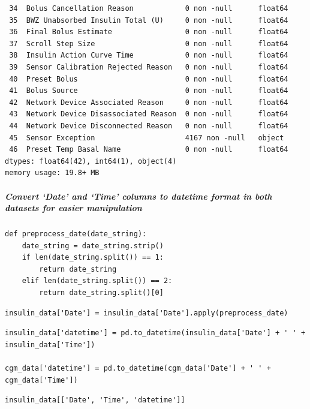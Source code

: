 \begin{verbatim}
 34  Bolus Cancellation Reason            0 non -null      float64
 35  BWZ Unabsorbed Insulin Total (U)     0 non -null      float64
 36  Final Bolus Estimate                 0 non -null      float64
 37  Scroll Step Size                     0 non -null      float64
 38  Insulin Action Curve Time            0 non -null      float64
 39  Sensor Calibration Rejected Reason   0 non -null      float64
 40  Preset Bolus                         0 non -null      float64
 41  Bolus Source                         0 non -null      float64
 42  Network Device Associated Reason     0 non -null      float64
 43  Network Device Disassociated Reason  0 non -null      float64
 44  Network Device Disconnected Reason   0 non -null      float64
 45  Sensor Exception                     4167 non -null   object 
 46  Preset Temp Basal Name               0 non -null      float64
dtypes: float64(42), int64(1), object(4)
memory usage: 19.8+ MB
\end{verbatim}

\subparagraph{Convert `Date' and `Time' columns to datetime format in both datasets for easier manipulation}

\begin{verbatim}
def preprocess_date(date_string):
    date_string = date_string.strip()
    if len(date_string.split()) == 1:
        return date_string
    elif len(date_string.split()) == 2:
        return date_string.split()[0]
\end{verbatim}

\begin{verbatim}
insulin_data['Date'] = insulin_data['Date'].apply(preprocess_date)
\end{verbatim}

\begin{verbatim}
insulin_data['datetime'] = pd.to_datetime(insulin_data['Date'] + ' ' + insulin_data['Time'])

cgm_data['datetime'] = pd.to_datetime(cgm_data['Date'] + ' ' + cgm_data['Time'])
\end{verbatim}

\begin{verbatim}
insulin_data[['Date', 'Time', 'datetime']]
\end{verbatim}

